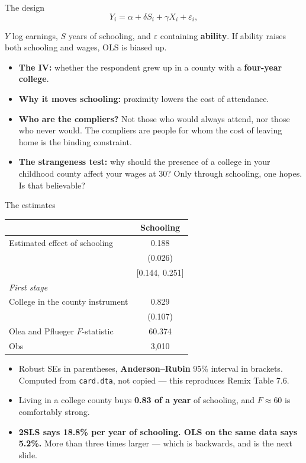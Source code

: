 \documentclass[
  11pt,
  ignorenonframetext,
  aspectratio=169,
]{beamer}
\providecommand{\tightlist}{%
  \setlength{\itemsep}{0pt}\setlength{\parskip}{0pt}}
\begin{document}
\begin{frame}{The design}
\protect{}\label{the-design}
\[
Y_i = \alpha + \delta S_i + \gamma X_i + \varepsilon_i,
\]

\(Y\) log earnings, \(S\) years of schooling, and \(\varepsilon\)
containing \textbf{ability}. If ability raises both schooling and wages,
OLS is biased up.

\begin{itemize}
\tightlist
\item
  \textbf{The IV:} whether the respondent grew up in a county with a
  \textbf{four-year college}.
\item
  \textbf{Why it moves schooling:} proximity lowers the cost of
  attendance.
\item
  \textbf{Who are the compliers?} Not those who would always attend, nor
  those who never would. The compliers are people for whom the cost of
  leaving home is the binding constraint.
\item
  \textbf{The strangeness test:} why should the presence of a college in
  your childhood county affect your wages at 30? Only through schooling,
  one hopes. Is that believable?
\end{itemize}
\end{frame}

\begin{frame}[fragile]{The estimates}
\protect{}\label{the-estimates}
\begin{center}\small
\begin{tabular}{lc}
\toprule
 & Schooling \\
\midrule
Estimated effect of schooling & 0.188 \\
 & (0.026) \\
 & [0.144, 0.251] \\
\midrule
\multicolumn{2}{l}{\emph{First stage}} \\
College in the county instrument & 0.829 \\
 & (0.107) \\
Olea and Pflueger $F$-statistic & 60.374 \\
Obs & 3,010 \\
\bottomrule
\end{tabular}
\end{center}

\footnotesize

\begin{itemize}
\tightlist
\item
  Robust SEs in parentheses, \textbf{Anderson--Rubin} 95\% interval in
  brackets. Computed from \texttt{card.dta}, not copied --- this
  reproduces Remix Table 7.6.
\item
  Living in a college county buys \textbf{0.83 of a year} of schooling,
  and \(F \approx 60\) is comfortably strong.
\item
  \textbf{2SLS says 18.8\% per year of schooling. OLS on the same data
  says 5.2\%.} More than three times larger --- which is backwards, and
  is the next slide.
\end{itemize}
\end{frame}
\end{document}
